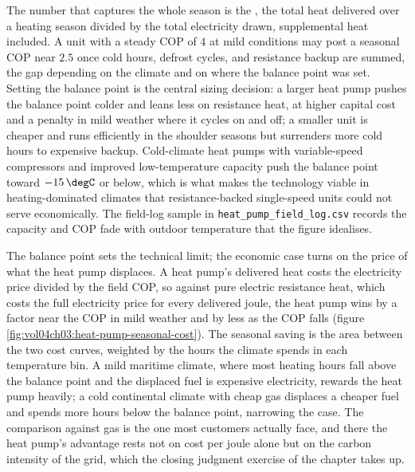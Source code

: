 The number that captures the whole season is the , the total heat delivered over a heating
season divided by the total electricity drawn, supplemental heat
included. A unit with a steady COP of $4$ at mild conditions may post a
seasonal COP near $2.5$ once cold hours, defrost cycles, and resistance
backup are summed, the gap depending on the climate and on where the
balance point was set. Setting the balance point is the central sizing
decision: a larger heat pump pushes the balance point colder and leans
less on resistance heat, at higher capital cost and a penalty in mild
weather where it cycles on and off; a smaller unit is cheaper and runs
efficiently in the shoulder seasons but surrenders more cold hours to
expensive backup. Cold-climate heat pumps with variable-speed
compressors and improved low-temperature capacity push the balance point
toward $-15\,\degC$ or below, which is what makes the technology viable
in heating-dominated climates that resistance-backed single-speed units
could not serve economically. The field-log sample in
\texttt{heat\_pump\_field\_log.csv} records the capacity and COP fade with
outdoor temperature that the figure idealises.



The balance point sets the technical limit; the economic case turns on the
price of what the heat pump displaces. A heat pump's delivered heat costs the
electricity price divided by the field COP, so against pure electric resistance
heat, which costs the full electricity price for every delivered joule, the
heat pump wins by a factor near the COP in mild weather and by less as the COP
falls (figure \ref{fig:vol04ch03:heat-pump-seasonal-cost}). The seasonal saving
is the area between the two cost curves, weighted by the hours the climate
spends in each temperature bin. A mild maritime climate, where most heating
hours fall above the balance point and the displaced fuel is expensive
electricity, rewards the heat pump heavily; a cold continental climate with
cheap gas displaces a cheaper fuel and spends more hours below the balance
point, narrowing the case. The comparison against gas is the one most
customers actually face, and there the heat pump's advantage rests not on cost
per joule alone but on the carbon intensity of the grid, which the closing
judgment exercise of the chapter takes up.



